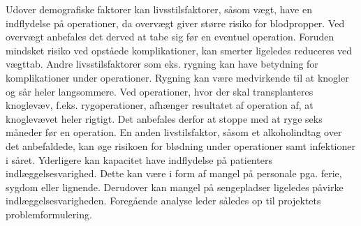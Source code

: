 Udover demografiske faktorer kan livsstilsfaktorer, såsom vægt, have en indflydelse på
operationer, da overvægt giver større risiko
for blodpropper\cite{Edmonds2004}. Ved overvægt anbefales det derved at tabe sig før
en eventuel operation. Foruden mindsket risiko ved opståede komplikationer, kan
smerter ligeledes reduceres ved vægttab.
Andre livsstilsfaktorer som eks. rygning kan have betydning
for komplikationer under operationer. Rygning kan være medvirkende til at knogler
og sår heler langsommere. Ved operationer, hvor der skal transplanteres knoglevæv, f.eks. rygoperationer, afhænger resultatet af operation af, at knoglevævet heler rigtigt.
Det anbefales derfor at stoppe med at ryge seks måneder før en operation. En anden livstilsfaktor, såsom et alkoholindtag over det anbefaldede, kan øge risikoen for blødning under operationer samt infektioner i såret.\cite{Nordjylland2014}
Yderligere kan kapacitet have indflydelse på patienters indlæggelsesvarighed. Dette kan være i form af mangel på personale pga. ferie, sygdom eller lignende. 
Derudover kan mangel på sengepladser ligeledes påvirke indlæggelsesvarigheden.
Foregående analyse leder således op til projektets problemformulering.



